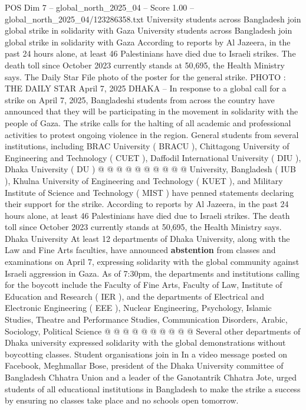 \begin{textsample}{POS Dim 7 – global\_north\_2025\_04 – Score 1.00 – global\_north\_2025\_04/123286358.txt}  \label{ex:f7_pos_356}
University students across Bangladesh join global strike in solidarity with Gaza University students across Bangladesh join global strike in solidarity with Gaza According to reports by Al Jazeera, in the past 24 hours alone, at least 46 Palestinians have died due to Israeli strikes.
The death toll since October 2023 currently stands at 50,695, the Health Ministry says.
The Daily Star File photo of the poster for the general strike.
PHOTO : THE DAILY STAR April 7, 2025 DHAKA -- In response to a global call for a strike on April 7, 2025, Bangladeshi students from across the country have announced that they will be participating in the movement in solidarity with the people of Gaza.
The strike calls for the halting of all academic and professional activities to protest ongoing violence in the region.
General students from several institutions, including BRAC University ( BRACU ), Chittagong University of Engineering and Technology ( CUET ), Daffodil International University ( DIU ), Dhaka University ( DU ) @ @ @ @ @ @ @ @ @ @ University, Bangladesh ( IUB ), Khulna University of Engineering and Technology ( KUET ), and Military Institute of Science and Technology ( MIST ) have penned statements declaring their support for the strike.
According to reports by Al Jazeera, in the past 24 hours alone, at least 46 Palestinians have died due to Israeli strikes.
The death toll since October 2023 currently stands at 50,695, the Health Ministry says.
Dhaka University At least 12 departments of Dhaka University, along with the Law and Fine Arts faculties, have announced \textbf{abstention} from classes and examinations on April 7, expressing solidarity with the global community against Israeli aggression in Gaza.
As of 7:30pm, the departments and institutions calling for the boycott include the Faculty of Fine Arts, Faculty of Law, Institute of Education and Research ( IER ), and the departments of Electrical and Electronic Engineering ( EEE ), Nuclear Engineering, Psychology, Islamic Studies, Theatre and Performance Studies, Communication Disorders, Arabic, Sociology, Political Science @ @ @ @ @ @ @ @ @ @ Several other departments of Dhaka university expressed solidarity with the global demonstrations without boycotting classes.
Student organisations join in In a video message posted on Facebook, Meghmallar Bose, president of the Dhaka University committee of Bangladesh Chhatra Union and a leader of the Ganotantrik Chhatra Jote, urged students of all educational institutions in Bangladesh to make the strike a success by ensuring no classes take place and no schools open tomorrow.

\end{textsample}
